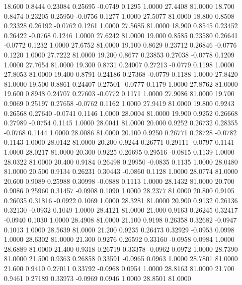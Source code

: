   18.600   0.8444   0.23084   0.25695  -0.0749   0.1295   1.0000  27.4408  81.0000
  18.700   0.8474   0.23205   0.25950  -0.0756   0.1277   1.0000  27.5077  81.0000
  18.800   0.8508   0.23328   0.26192  -0.0762   0.1261   1.0000  27.5685  81.0000
  18.900   0.8545   0.23452   0.26422  -0.0768   0.1246   1.0000  27.6242  81.0000
  19.000   0.8585   0.23580   0.26641  -0.0772   0.1232   1.0000  27.6752  81.0000
  19.100   0.8629   0.23712   0.26846  -0.0776   0.1220   1.0000  27.7222  81.0000
  19.200   0.8677   0.23853   0.27038  -0.0778   0.1209   1.0000  27.7654  81.0000
  19.300   0.8731   0.24007   0.27213  -0.0779   0.1198   1.0000  27.8053  81.0000
  19.400   0.8791   0.24186   0.27368  -0.0779   0.1188   1.0000  27.8420  81.0000
  19.500   0.8861   0.24407   0.27501  -0.0777   0.1179   1.0000  27.8762  81.0000
  19.600   0.8948   0.24707   0.27603  -0.0772   0.1171   1.0000  27.9086  81.0000
  19.700   0.9069   0.25197   0.27658  -0.0762   0.1162   1.0000  27.9419  81.0000
  19.800   0.9243   0.26568   0.27640  -0.0741   0.1146   1.0000  28.0004  81.0000
  19.900   0.9252   0.26668   0.27989  -0.0754   0.1145   1.0000  28.0041  81.0000
  20.000   0.9252   0.26732   0.28355  -0.0768   0.1144   1.0000  28.0086  81.0000
  20.100   0.9250   0.26771   0.28728  -0.0782   0.1143   1.0000  28.0142  81.0000
  20.200   0.9244   0.26771   0.29111  -0.0797   0.1141   1.0000  28.0217  81.0000
  20.300   0.9225   0.26695   0.29516  -0.0815   0.1139   1.0000  28.0322  81.0000
  20.400   0.9184   0.26498   0.29950  -0.0835   0.1135   1.0000  28.0480  81.0000
  20.500   0.9134   0.26231   0.30443  -0.0860   0.1128   1.0000  28.0774  81.0000
  20.600   0.9089   0.25988   0.30998  -0.0888   0.1113   1.0000  28.1432  81.0000
  20.700   0.9086   0.25960   0.31457  -0.0908   0.1090   1.0000  28.2377  81.0000
  20.800   0.9105   0.26035   0.31816  -0.0922   0.1069   1.0000  28.3281  81.0000
  20.900   0.9132   0.26136   0.32130  -0.0932   0.1049   1.0000  28.4121  81.0000
  21.000   0.9163   0.26245   0.32417  -0.0940   0.1030   1.0000  28.4908  81.0000
  21.100   0.9198   0.26358   0.32682  -0.0947   0.1013   1.0000  28.5639  81.0000
  21.200   0.9235   0.26473   0.32929  -0.0953   0.0998   1.0000  28.6302  81.0000
  21.300   0.9276   0.26592   0.33160  -0.0958   0.0984   1.0000  28.6889  81.0000
  21.400   0.9318   0.26719   0.33378  -0.0962   0.0972   1.0000  28.7390  81.0000
  21.500   0.9363   0.26858   0.33591  -0.0965   0.0963   1.0000  28.7801  81.0000
  21.600   0.9410   0.27011   0.33792  -0.0968   0.0954   1.0000  28.8163  81.0000
  21.700   0.9461   0.27189   0.33973  -0.0969   0.0946   1.0000  28.8501  81.0000
